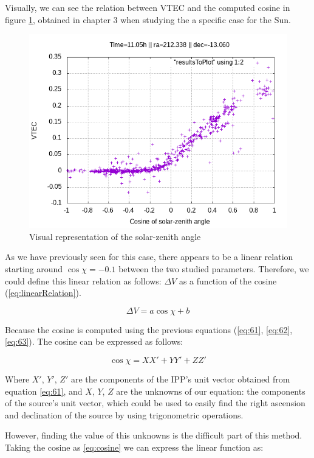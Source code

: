 Visually, we can see the relation between VTEC and the computed cosine in figure \ref{fig:solar-zenith-angle}, obtained in chapter 3 when studying the a specific case for the Sun.

\begin{figure}[!htb]
	\begin{centering}
		\includegraphics[width=0.5\linewidth]{images/ch4/resultSunTest.png}
		\caption{Visual representation of the solar-zenith angle}
		\label{fig:solar-zenith-angle}
	\end{centering}
\end{figure}

As we have previously seen for this case, there appears to be a linear relation starting around $\cos \chi = -0.1$ between the two studied parameters. Therefore, we could define this linear relation as follows: $\Delta V$ as a function of the cosine (\ref{eq:linearRelation}).

\begin{equation} \label{eq:linearRelation}
\Delta V = a\cos \chi + b
\end{equation}

Because the cosine is computed using the previous equations (\ref{eq:61}, \ref{eq:62}, \ref{eq:63}). The cosine can be expressed as follows:

\begin{equation} \label{eq:cosine}
\cos \chi = XX' + YY' + ZZ'
\end{equation}

Where $X'$, $Y'$, $Z'$ are the components of the IPP's unit vector obtained from equation \ref{eq:61}, and $X$, $Y$, $Z$ are the unknowns of our equation: the components of the source's unit vector, which could be used to easily find the right ascension and declination of the source by using trigonometric operations.

However, finding the value of this unknowns is the difficult part of this method. Taking the cosine as \ref{eq:cosine} we can express the linear function as:

